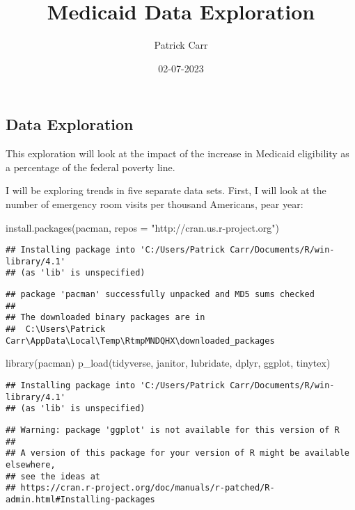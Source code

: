 \documentclass[
]{article}
\title{Medicaid Data Exploration}
\author{Patrick Carr}
\date{02-07-2023}
\newenvironment{Shaded}{\begin{snugshade}}{\end{snugshade}}
\newcommand{\AttributeTok}[1]{\textcolor[rgb]{0.77,0.63,0.00}{#1}}
\newcommand{\FunctionTok}[1]{\textcolor[rgb]{0.00,0.00,0.00}{#1}}
\newcommand{\NormalTok}[1]{#1}
\newcommand{\StringTok}[1]{\textcolor[rgb]{0.31,0.60,0.02}{#1}}
\begin{document}
\maketitle

\hypertarget{data-exploration}{%
\subsection{Data Exploration}\label{data-exploration}}

This exploration will look at the impact of the increase in Medicaid
eligibility as a percentage of the federal poverty line.

I will be exploring trends in five separate data sets. First, I will
look at the number of emergency room visits per thousand Americans, pear
year:

\begin{Shaded}
\begin{Highlighting}[]
\FunctionTok{install.packages}\NormalTok{(}\StringTok{\textquotesingle{}pacman\textquotesingle{}}\NormalTok{, }\AttributeTok{repos =} \StringTok{"http://cran.us.r{-}project.org"}\NormalTok{)}
\end{Highlighting}
\end{Shaded}

\begin{verbatim}
## Installing package into 'C:/Users/Patrick Carr/Documents/R/win-library/4.1'
## (as 'lib' is unspecified)
\end{verbatim}

\begin{verbatim}
## package 'pacman' successfully unpacked and MD5 sums checked
## 
## The downloaded binary packages are in
##  C:\Users\Patrick Carr\AppData\Local\Temp\RtmpMNDQHX\downloaded_packages
\end{verbatim}

\begin{Shaded}
\begin{Highlighting}[]
\FunctionTok{library}\NormalTok{(pacman)}
\FunctionTok{p\_load}\NormalTok{(tidyverse, janitor, lubridate, dplyr, ggplot, tinytex)}
\end{Highlighting}
\end{Shaded}

\begin{verbatim}
## Installing package into 'C:/Users/Patrick Carr/Documents/R/win-library/4.1'
## (as 'lib' is unspecified)
\end{verbatim}

\begin{verbatim}
## Warning: package 'ggplot' is not available for this version of R
## 
## A version of this package for your version of R might be available elsewhere,
## see the ideas at
## https://cran.r-project.org/doc/manuals/r-patched/R-admin.html#Installing-packages
\end{verbatim}
\end{document}

